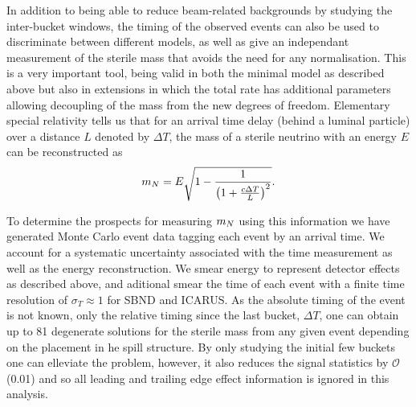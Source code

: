 \documentclass[11pt, a4paper]{article}
\def\ster{\ensuremath N}
\begin{document}
In addition to being able to reduce beam-related backgrounds by studying the
inter-bucket windows, the timing of the observed events can also be used to
discriminate between different models, as well as give an independant
measurement of the sterile mass that avoids the need for any normalisation. This is a very important tool, being valid in both the minimal model as described above but also in extensions in which the total rate has additional parameters allowing decoupling of the mass from the new degrees of freedom. 
Elementary special relativity tells us that for an arrival time delay (behind a luminal particle) over a
distance $L$ denoted by $\Delta T$, the mass of a sterile neutrino with an
energy $E$ can be reconstructed as 
%
\[ m_{\ster} = E\sqrt{1-\frac{1}{\left(1+\frac{c\Delta T}{L}\right)^2}}. \]

To determine the prospects for measuring $m_{\ster}$ using this information we
have generated Monte Carlo event data tagging each event by an arrival time.
We account for a systematic uncertainty associated with the time measurement as
well as the energy reconstruction. We smear energy to represent detector
effects as described above, and aditional smear the time of each event with a
finite time resolution of $\sigma_T  \approx 1$ for SBND and ICARUS. As the
absolute timing of the event is not known, only the relative timing since the
last bucket, $\Delta T$, one can obtain up to 81 degenerate solutions for the
sterile mass from any given event depending on the placement in he spill
structure. By only studying the initial few buckets one can elleviate the
problem, however, it also reduces the signal statistics by $\mathcal{O}$(0.01)
and so all leading and trailing edge effect information is ignored in this analysis. \\
\end{document}
